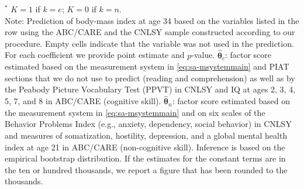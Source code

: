 \documentclass[static]{JJH-Beamer}
\begin{document}
\begin{frame}
\begin{table}[H]
\begin{center}
\end{center}
\tiny \flushleft
$^\ast$ $K=1$ if $k=e$; $K=0$ if $k=n$.\\
Note: Prediction of body-mass index at age 34 based on the variables listed in the row using the ABC/CARE and the CNLSY sample constructed according to our procedure. Empty cells indicate that the variable was not used in the prediction. For each coefficient we provide point estimate and $p$-value. $\hat{\bm{\theta}}_{c}$: factor score estimated based on the measurement system in \eqref{eq:sa-msystemmain} and PIAT sections that we do not use to predict (reading and comprehension) as well as by the Peabody Picture Vocabulary Test (PPVT) in CNLSY and IQ at ages 2, 3, 4, 5, 7, and 8 in ABC/CARE (cognitive skill). $\hat{\bm{\theta}}_{n}$: factor score estimated based on the measurement system in \eqref{eq:sa-msystemmain} and on six scales of the Behavior Problems Index (e.g., anxiety, dependency, social behavior) in CNLSY and measures of somatization, hostility, depression, and a global mental health index at age 21 in ABC/CARE (non-cognitive skill). Inference is based on the empirical bootstrap distribution. If the estimates for the constant terms are in the ten or hundred thousands, we report a figure that has been rounded to the thousands.\\
\end{table}

\end{frame}
\end{document}
